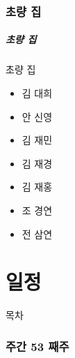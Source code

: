 \documentclass[aspectratio=1610,20pt,xcolor=pdftex,dvipsnames,table,handout]{beamer}
\begin{document}
		\section{초량 집}
		\begin{frame} [t,plain]
		\frametitle{초량 집}
			\begin{block} {초량 집}
			\setlength{\leftmargini}{1em}			
			\begin{itemize}
				\item 	\hrulefill	김 대희
				\item 	\hrulefill	안 신영
				\item 	\hrulefill	김 재민
				\item 	\hrulefill	김 재경
				\item 	\hrulefill	김 재홍
				\item 	\hrulefill	조 경연
				\item 	\hrulefill	전 삼연
			\end{itemize}
			\end{block}			
								
		\end{frame}						
			

		\part{일정}
		\frame{\partpage}
		
\label{part2} 	%

		\begin{frame} [plain]{목차}
		\tableofcontents%
		\end{frame}


		\section{	주간 
					53 째주 }	%
\end{document}

